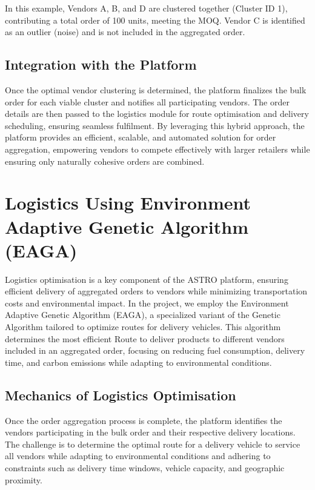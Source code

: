 In this example, Vendors A, B, and D are clustered together (Cluster ID 1), contributing a total order of 100 units, meeting the MOQ. Vendor C is identified as an outlier (noise) and is not included in the aggregated order.

\subsection{Integration with the Platform}

Once the optimal vendor clustering is determined, the platform finalizes the bulk order for each viable cluster and notifies all participating vendors. The order details are then passed to the logistics module for route optimisation and delivery scheduling, ensuring seamless fulfilment. By leveraging this hybrid approach, the platform provides an efficient, scalable, and automated solution for order aggregation, empowering vendors to compete effectively with larger retailers while ensuring only naturally cohesive orders are combined.


\section{Logistics Using Environment Adaptive Genetic Algorithm (EAGA)}

Logistics optimisation is a key component of the ASTRO platform, ensuring efficient delivery of aggregated orders to vendors while minimizing transportation costs and environmental impact. In the project, we employ the Environment Adaptive Genetic Algorithm (EAGA), a specialized variant of the Genetic Algorithm tailored to optimize routes for delivery vehicles. This algorithm determines the most efficient Route to deliver products to different vendors included in an aggregated order, focusing on reducing fuel consumption, delivery time, and carbon emissions while adapting to environmental conditions.

\subsection{Mechanics of Logistics Optimisation}

Once the order aggregation process is complete, the platform identifies the vendors participating in the bulk order and their respective delivery locations. The challenge is to determine the optimal route for a delivery vehicle to service all vendors while adapting to environmental conditions and adhering to constraints such as delivery time windows, vehicle capacity, and geographic proximity.

